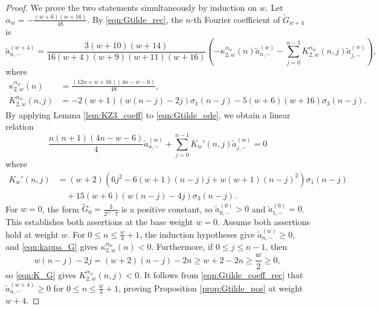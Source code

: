 \documentclass[10pt,reqno]{amsproc}
\newcommand{\wtilde}{\widetilde}
\newcommand{\1}{\mathds{1}}	%
\theoremstyle{definition}
\theoremstyle{remark}
\begin{document}
\begin{proof}
    We prove the two statements simultaneously by induction on $w$.
    Let $\alpha_w = -\frac{(w+6)(w+16)}{48}$.
    By \eqref{eqn:Gtilde_rec}, the $n$-th Fourier coefficient of $\wtilde{G}_{w+4}$ is
    \begin{equation}
        \label{eqn:Gtilde_coeff_rec}
        \tilde{a}_{n,-}^{(w+4)} = \frac{3(w+10)(w+14)}{16(w+4)(w+9)(w+11)(w+16)} \left(-\kappa_{2,w}^{\alpha_w}(n) \tilde{a}_{n,-}^{(w)} - \sum_{j=0}^{n-1} K_{2,w}^{\alpha_w}(n,j) \tilde{a}_{j,-}^{(w)}\right),
    \end{equation}
    where
    \begin{align}
        \kappa_{2,w}^{\alpha_w}(n) &= \frac{(12n + w + 16)(4n-w-6)}{48}, \label{eqn:kappa_G} \\
        K_{2,w}^{\alpha_w}(n,j) &= -2(w+1)(w(n-j) - 2j) \sigma_1(n-j) - 5(w+6)(w+16) \sigma_3(n-j). \label{eqn:K_G}
    \end{align}
    By applying Lemma \ref{lem:KZ3_coeff} to \eqref{eqn:Gtilde_ode}, we obtain a linear relation
    \begin{equation}
        \label{eqn:Gtilde_coeff_linear}
        \frac{n(n+1)(4n-w-6)}{4} \tilde{a}_{n,-}^{(w)} + \sum_{j=0}^{n-1} K_w'(n,j) \tilde{a}_{j,-}^{(w)} = 0
    \end{equation}
    where
    \begin{equation}
        \label{eqn:Kprime}
        \begin{aligned}
        K_w'(n,j) &= (w+2)(6j^2 - 6(w+1)(n-j)j + w(w+1)(n-j)^2) \sigma_1(n-j) \\
        &\quad + 15(w+6)(w(n-j) - 4j) \sigma_3(n-j).
        \end{aligned}
    \end{equation}
    For $w=0$, the form $\wtilde{G}_0=\frac{3}{2^{11}\cdot7}$ is a positive constant, so $\tilde{a}_{0,-}^{(0)}>0$ and $\tilde{a}_{1,-}^{(0)}=0$.
    This establishes both assertions at the base weight $w=0$.
    Assume both assertions hold at weight $w$.
    For $0\leq n\leq \frac{w}{4}+1$, the induction hypotheses give $\tilde{a}_{n,-}^{(w)}\geq0$, and \eqref{eqn:kappa_G} gives $\kappa_{2,w}^{\alpha_w}(n)<0$.
    Furthermore, if $0\leq j\leq n-1$, then
    \[
        w(n-j)-2j=(w+2)(n-j)-2n\geq w+2-2n\geq \frac{w}{2}\geq0,
    \]
    so \eqref{eqn:K_G} gives $K_{2,w}^{\alpha_w}(n,j)<0$.
    It follows from \eqref{eqn:Gtilde_coeff_rec} that $\tilde{a}_{n,-}^{(w+4)}\geq0$ for $0\leq n\leq \frac{w}{4}+1$, proving Proposition \ref{prop:Gtilde_pos} at weight $w+4$.


\end{proof}
\end{document}
